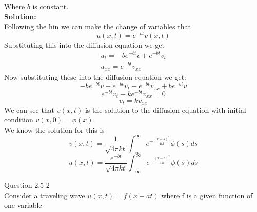 \documentclass[answers,12pt,addpoints]{exam}
\begin{document}
\begin{questions}
    Where $b$ is constant.\\
    \textbf{Solution:}\\
    Following the hin we can make the change of variables that
    $$ u(x,t) = e^{-bt}v(x,t) $$
    Substituting this into the diffusion equation we get
    \begin{align*}
        u_t = -be^{-bt}v + e^{-bt}v_t\\
        u_{xx} = e^{-bt}v_{xx}
    \end{align*}
    Now substituting these into the diffusion equation we get:
    $$ -be^{-bt}v + e^{-bt}v_t - e^{-bt}v_{xx} + be^{-bt}v$$
    $$ e^{-bt}v_t - ke^{-bt}v_{xx} = 0$$
    $$ v_t = kv_{xx}$$
    We can see that $v(x,t)$ is the solution to the diffusion equation with initial condition $v(x,0) = \phi(x)$.\\
    We know the solution for this is 
    $$ v(x,t) = \frac{1}{\sqrt{4\pi kt}}\int_{-\infty}^{\infty}e^{-\frac{(x-s)^2}{4kt}}\phi(s)ds$$
    $$ u(x,t) = \frac{e^{-bt} }{\sqrt{4\pi kt}}\int_{-\infty}^{\infty}e^{-\frac{(x-s)^2}{4kt}}\phi(s)ds$$

    \question Question 2.5 2\\
    Consider a traveling wave $u(x,t) = f(x-at)$ where f is a given function of one variable
\end{questions}
\end{document}
